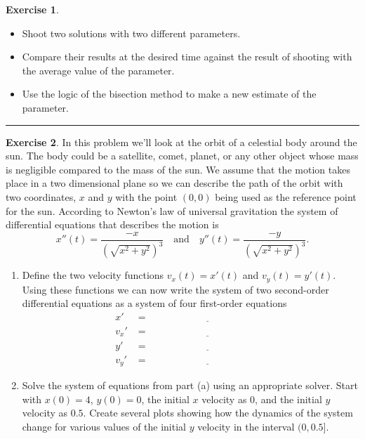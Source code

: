 \documentclass[
]{book}
\theoremstyle{definition}
\theoremstyle{definition}
\theoremstyle{definition}
\newtheorem{exercise}{Exercise}[chapter]
\theoremstyle{remark}
\begin{document}
\begin{exercise}
\begin{enumerate}
  \begin{itemize}
  \item
    Shoot two solutions with two different parameters.
  \item
    Compare their results at the desired time against the result of
    shooting with the average value of the parameter.
  \item
    Use the logic of the bisection method to make a new estimate of
    the parameter.
  \end{itemize}
\end{enumerate}
\end{exercise}

\begin{center}\rule{0.5\linewidth}{0.5pt}\end{center}

\begin{exercise}
\protect\hypertarget{exr:unnamed-chunk-503}{}{\label{exr:unnamed-chunk-503} }In this problem we'll look at the orbit of a celestial body around the
sun. The body could be a satellite, comet, planet, or any other object
whose mass is negligible compared to the mass of the sun. We assume that
the motion takes place in a two dimensional plane so we can describe the
path of the orbit with two coordinates, \(x\) and \(y\) with the point
\((0,0)\) being used as the reference point for the sun. According to
Newton's law of universal gravitation the system of differential
equations that describes the motion is
\[x''(t) = \frac{-x}{\left( \sqrt{x^2 + y^2} \right)^3} \quad \text{and} \quad y''(t)
    = \frac{-y}{\left( \sqrt{x^2 + y^2} \right)^3}.\]

\begin{enumerate}
\def\labelenumi{\alph{enumi}.}
\item
  Define the two velocity functions \(v_x(t) = x'(t)\) and \(v_y(t) =  y'(t)\). Using these functions we can now write the
  system of two second-order differential equations as a system of
  four first-order equations \[\begin{aligned}
                  x' &= \underline{\hspace{2in}} \\
                  v_x ' &= \underline{\hspace{2in}} \\
                  y' &= \underline{\hspace{2in}} \\
                  v_y' &= \underline{\hspace{2in}} 
              \end{aligned}\]
\item
  Solve the system of equations from part (a) using an appropriate
  solver. Start with \(x(0) = 4\), \(y(0) = 0\), the initial \(x\) velocity
  as \(0\), and the initial \(y\) velocity as \(0.5\). Create several plots
  showing how the dynamics of the system change for various values of
  the initial \(y\) velocity in the interval \((0,0.5]\).
\end{enumerate}
\end{exercise}
\end{document}
